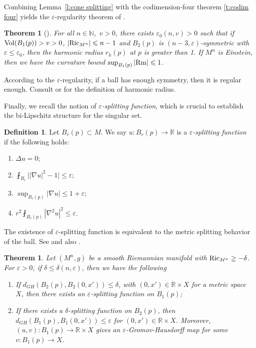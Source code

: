 \documentclass[11pt,reqno]{amsart}
\numberwithin{equation}{section}
\newcommand{\RR}{\mathds{R}}
\newcommand{\Rm}{{\rm Rm}}
\newcommand{\Ric}{{\rm Ric}}
\newcommand{\Vol}{{\rm Vol}}
\newtheorem{theorem}[thm]{Theorem}
\theoremstyle{definition}
\newtheorem{definition}[thm]{Definition}
\theoremstyle{remark}
\begin{document}
Combining Lemma~\ref{l:cone splitting} with the codimension-four theorem \ref{t:codim four} yields the $\varepsilon$-regularity theorem of \cite{cn}.

\begin{theorem}[\cite{cn}]\label{t:eps_regularity}
    For all $n\in\mathbb{N},\,\,v>0$, there exists $\varepsilon_0(n,v)>0$ such that if $\Vol(B_1(p)) > v >0$, $|\Ric_{M^n}|\leqslant n-1$ and $B_2(p)$ is $(n-3,\varepsilon)$-symmetric with $\varepsilon \leqslant \varepsilon_0$, then the harmonic radius $r_h(p)$ at $p$ is greater than 1. If $M^n$ is Einstein, then we have the curvature bound $\sup_{B_1(p)} |\Rm| \leqslant 1$.  
\end{theorem}

According to the $\varepsilon$-regularity, if a ball has enough symmetry, then it is regular enough. Consult \cite{and90} or \cite{jn} for the definition of harmonic radius.


Finally, we recall the notion of \textit{$\varepsilon$-splitting function}, which is crucial to establish the bi-Lipschitz structure for the singular set.

\begin{definition}
    Let $B_r(p) \subset M$. We say $u: B_r(p) \to \RR$ is a \textit{$\varepsilon$-splitting function} if the following holds:
    \begin{enumerate}
        \item $\Delta u = 0$;
        \item $\fint_{B_r} \big| |\nabla u|^2 - 1 \big| \leqslant \varepsilon$;
        \item $\sup_{B_r(p)} |\nabla u| \leqslant 1+\varepsilon$;
        \item $r^2 \fint_{B_r(p)} |\nabla^2 u|^2 \leqslant \varepsilon$.
    \end{enumerate}
\end{definition}

The existence of $\varepsilon$-splitting function is equivalent to the metric splitting behavior of the ball. See \cite{cc} and also \cite{cjn}.

\begin{theorem}\label{t:almost splitting}
    Let $(M^n,g)$ be a smooth Riemannian manifold with $\Ric_{M^n} \ge -\delta$. For $\varepsilon>0$, if $\delta \leqslant \delta(n,\varepsilon)$, then we have the following
    \begin{enumerate}
        \item If $d_{GH}(B_2(p), B_2(0,x')) \leqslant \delta$, with $(0,x') \in \RR \times X$ for a metric space $X$,  then there exists an $\varepsilon$-splitting function on $B_1(p)$;
        \item If there exists a $\delta$-splitting function on $B_2(p)$, then $d_{GH}(B_1(p),B_1(0,x')) \leqslant \varepsilon$ for $(0,x') \in \RR \times X$. Moreover, $(u,v) : B_1(p) \to \RR \times X$ gives an $\varepsilon$-Gromov-Hausdorff map for some $v:B_1(p) \to X$.
    \end{enumerate}
\end{theorem}
\end{document}
